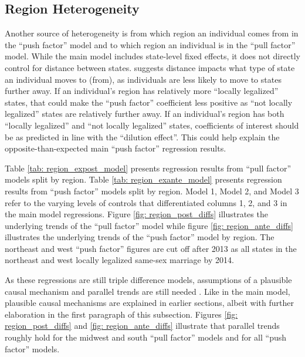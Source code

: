\documentclass[12pt,letterpaper]{article}
\begin{document}
\clearpage
\subsection{Region Heterogeneity}

Another source of heterogeneity is from which region an individual comes from in the “push factor” model and to which region an individual is in the “pull factor” model. While the main model includes state-level fixed effects, it does not directly control for distance between states. \citep{1} suggests distance impacts what type of state an individual moves to (from), as individuals are less likely to move to states further away. If an individual’s region has relatively more “locally legalized” states, that could make the  “push factor” coefficient less positive as “not locally legalized” states are relatively further away. If an individual’s region has both “locally legalized” and “not locally legalized” states, coefficients of interest should be as predicted in line with the “dilution effect”. This could help explain the opposite-than-expected main “push factor” regression results.

Table \ref{tab: region_expost_model} presents regression results from “pull factor” models split by region. Table \ref{tab: region_exante_model} presents regression results from “push factor” models split by region. Model 1, Model 2, and Model 3 refer to the varying levels of controls that differentiated columns 1, 2, and 3 in the main model regressions.  Figure \ref{fig: region_post_diffs} illustrates the underlying trends of the “pull factor” model while figure \ref{fig: region_ante_diffs} illustrates the underlying trends of the “push factor” model by region. The northeast and west “push factor” figures are cut off after 2013 as all states in the northeast and west locally legalized same-sex marriage by 2014.

As these regressions are still triple difference models, assumptions of a plausible causal mechanism and parallel trends are still needed \citep{24, 25}. Like in the main model, plausible causal mechanisms are explained in earlier sections, albeit with further elaboration in the first paragraph of this subsection. Figures \ref{fig: region_post_diffs} and \ref{fig: region_ante_diffs} illustrate that parallel trends roughly hold for the midwest and south “pull factor” models and for all “push factor” models. 
\end{document}
